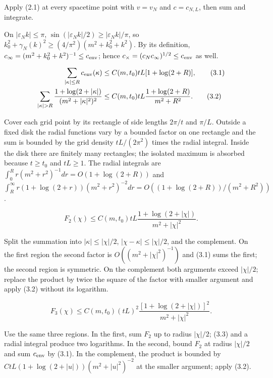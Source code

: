 \documentclass[11pt,a4paper]{article}
\newcommand{\eps}{\varepsilon}
\begin{document}
\Because Apply (2.1) at every spacetime point with $v=v_N$ and $c=c_{N,L}$,
then sum and integrate.

\QedStep



\Because On $|\eps_Nk|\le\pi$,
$\sin(|\eps_Nk|/2)\ge|\eps_Nk|/\pi$, so
$k_0^2+\gamma_N(k)^2\ge(4/\pi^2)(m^2+k_0^2+k^2)$.  By its definition,
$c_\infty=(m^2+k_0^2+k^2)^{-1}\le c_{\rm env}$; hence
$c_\times=(c_Nc_\infty)^{1/2}\le c_{\rm env}$ as well.

\begin{align*}
 \sum_{|\kappa|\le R}c_{\rm env}(\kappa)
 &\le C(m,t_0)tL[1+\log(2+R)],\tag{3.1}\\
 \sum_{|\kappa|>R}\frac{1+\log(2+|\kappa|)}{(m^2+|\kappa|^2)^2}
 &\le C(m,t_0)tL\frac{1+\log(2+R)}{m^2+R^2}.\tag{3.2}
\end{align*}

\Because Cover each grid point by its rectangle of side lengths $2\pi/t$ and
$\pi/L$.  Outside a fixed disk the radial functions vary by a bounded factor on one
rectangle and the sum is bounded by the grid density $tL/(2\pi^2)$ times the radial
integral.  Inside the disk there are finitely many rectangles; the isolated maximum is
absorbed because $t\ge t_0$ and $tL\ge1$.  The radial integrals are
$\int_0^Rr(m^2+r^2)^{-1}dr=O(1+\log(2+R))$ and
$\int_R^\infty r(1+\log(2+r))(m^2+r^2)^{-2}dr
=O((1+\log(2+R))/(m^2+R^2))$.

\[
 F_2(\chi)\le C(m,t_0)tL
 \frac{1+\log(2+|\chi|)}{m^2+|\chi|^2}.\tag{3.3}
\]

\Because Split the summation into
$|\kappa|\le|\chi|/2$, $|\chi-\kappa|\le|\chi|/2$, and the complement.
On the first region the second factor is
$O((m^2+|\chi|^2)^{-1})$ and (3.1) sums the first; the second region is
symmetric.  On the complement both arguments exceed $|\chi|/2$; replace the product
by twice the square of the factor with smaller argument and apply (3.2) without its
logarithm.

\[
 F_3(\chi)\le C(m,t_0)(tL)^2
 \frac{[1+\log(2+|\chi|)]^2}{m^2+|\chi|^2}.\tag{3.4}
\]

\Because Use the same three regions.  In the first, sum $F_2$ up to radius
$|\chi|/2$; (3.3) and a radial integral produce two logarithms.  In the second,
bound $F_2$ at radius $|\chi|/2$ and sum $c_{\rm env}$ by (3.1).  In the
complement, the product is bounded by
$C tL(1+\log(2+|u|))(m^2+|u|^2)^{-2}$ at the smaller argument; apply (3.2).
\end{document}
